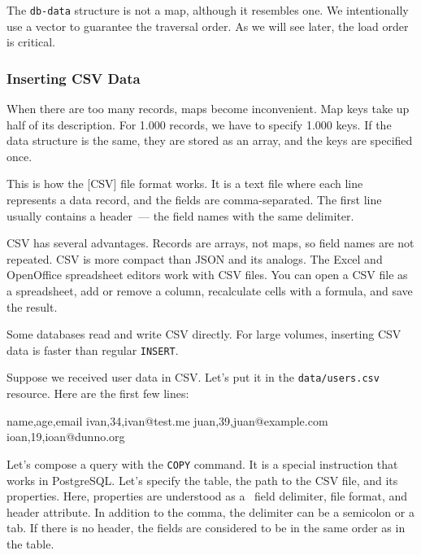 \fi

The \verb|db-data| structure is not a map, although it resembles one. We intentionally use a vector to guarantee the traversal order. As we will see later, the load order is critical.

\subsubsection*{Inserting CSV Data}


When there are too many records, maps become inconvenient. Map keys take up half of its description. For 1.000 records, we have to specify 1.000 keys. If the data structure is the same, they are stored as an array, and the keys are specified once.

This is how the [CSV] file format works. It is a text file where each line represents a data record, and the fields are comma-separated. The first line usually contains a header~--- the field names with the same delimiter.

CSV has several advantages. Records are arrays, not maps, so field names are not repeated. CSV is more compact than JSON and its analogs. The Excel and OpenOffice spreadsheet editors work with CSV files. You can open a CSV file as a spreadsheet, add or remove a column, recalculate cells with a formula, and save the result.


Some databases read and write CSV directly. For large volumes, inserting CSV data is faster than regular \verb|INSERT|.

Suppose we received user data in CSV. Let's put it in the \verb|data/users.csv| resource. Here are the first few lines:

\begin{english}
  \begin{text}
name,age,email
ivan,34,ivan@test.me
juan,39,juan@example.com
ioan,19,ioan@dunno.org
  \end{text}
\end{english}


Let's compose a query with the \verb|COPY| command. It is a special instruction that works in PostgreSQL. Let's specify the table, the path to the CSV file, and its properties. Here, properties are understood as a  field delimiter, file format, and header attribute. In addition to the comma, the delimiter can be a semicolon or a tab. If there is no header, the fields are considered to be in the same order as in the table.

